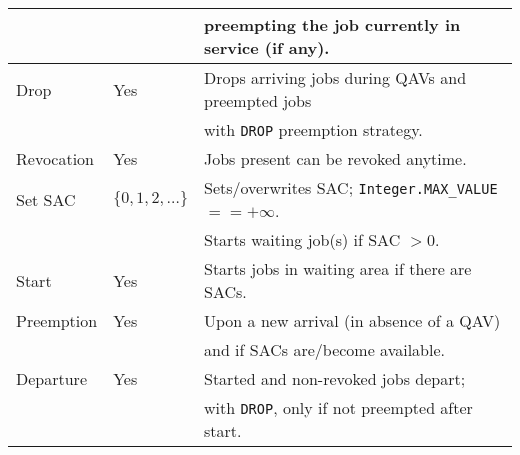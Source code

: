 \documentclass[12pt]{book}
\begin{document}
\begin{tabular}{|l|l|l|}
        &     & preempting the job currently in service (if any). \\
\hline
Drop & Yes & Drops arriving jobs during QAVs and preempted jobs \\
     &     & with \lstinline|DROP| preemption strategy. \\
\hline
Revocation & Yes & Jobs present can be revoked anytime. \\
\hline
Set SAC & $\{0, 1, 2, \ldots\}$ & Sets/overwrites SAC; \lstinline|Integer.MAX_VALUE| $== +\infty$. \\
        &                       & Starts waiting job(s) if SAC $> 0$. \\
\hline
Start & Yes & Starts jobs in waiting area if there are SACs. \\
\hline
Preemption & Yes & Upon a new arrival (in absence of a QAV) \\
           &     & and if SACs are/become available. \\
\hline
Departure & Yes & Started and non-revoked jobs depart; \\
          &     & with \lstinline|DROP|, only if not preempted after start. \\
\hline
\end{tabular}
\end{document}
